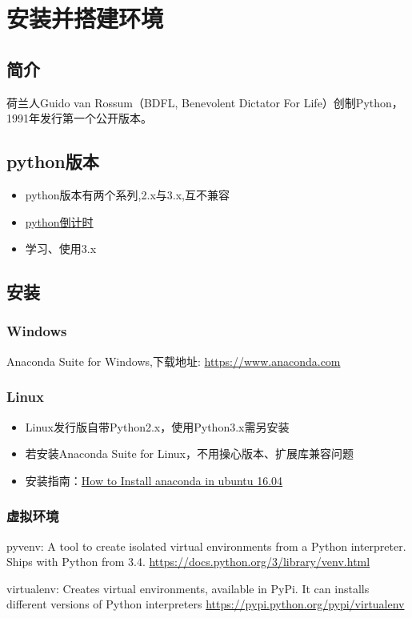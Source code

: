\chapter{安装并搭建环境}

\section{简介}

 荷兰人Guido van Rossum（BDFL, Benevolent Dictator For Life）创制Python，1991年发行第一个公开版本。

 \section{python版本}

\begin{itemize}
\item python版本有两个系列,2.x与3.x,互不兼容
\item \href{https://pythonclock.org/}{python倒计时}
\item 学习、使用3.x
\end{itemize}

\section{安装}
\subsection{Windows}
Anaconda Suite for Windows,下载地址: \url{https://www.anaconda.com}
\subsection{Linux}

\begin{itemize}
\item Linux发行版自带Python2.x，使用Python3.x需另安装
\item 若安装Anaconda Suite for Linux，不用操心版本、扩展库兼容问题
\item 安装指南：\href{https://poweruphosting.com/blog/install-anaconda-python-ubuntu-16-04/}{How to Install anaconda in ubuntu 16.04}
\end{itemize}
\subsection{虚拟环境}
\begin{description}
\item{pyvenv:} A tool to create isolated virtual environments from a Python interpreter. Ships with Python from 3.4.
\url{https://docs.python.org/3/library/venv.html}
\item{virtualenv:} Creates virtual environments, available in PyPi. It can installs different versions of Python interpreters \url{https://pypi.python.org/pypi/virtualenv}
\end{description}

